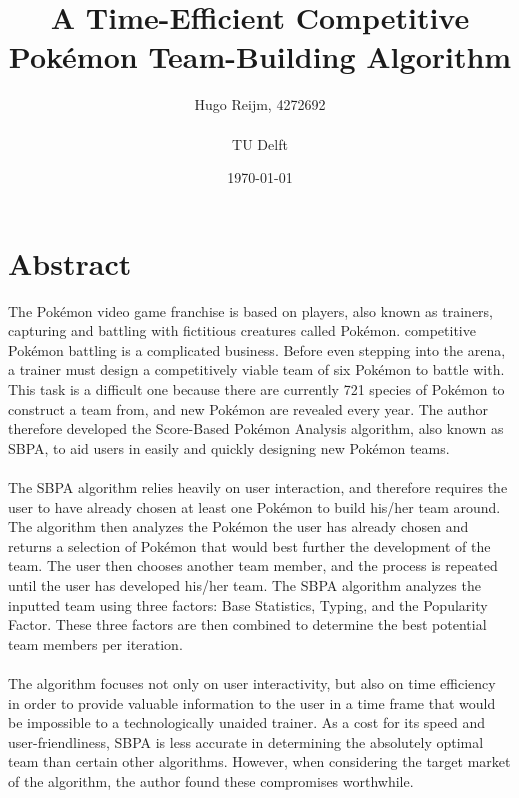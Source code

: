 \documentclass{article}
\title{A Time-Efficient Competitive Pok\'emon Team-Building Algorithm}
\author{Hugo Reijm, 4272692\\\\TU Delft}
\date{\today}
\begin{document}
\maketitle

\newpage
\section*{Abstract}
The Pok\'emon video game franchise is based on players, also known as trainers, capturing and battling with fictitious creatures called Pok\'emon. competitive Pok\'emon battling is a complicated business. Before even stepping into the arena, a trainer must design a competitively viable team of six Pok\'emon to battle with. This task is a difficult one because there are currently 721 species of Pok\'emon to construct a team from, and new Pok\'emon are revealed every year. The author therefore developed the Score-Based Pok\'emon Analysis algorithm, also known as SBPA, to aid users in easily and quickly designing new Pok\'emon teams.\\\\
The SBPA algorithm relies heavily on user interaction, and therefore requires the user to have already chosen at least one Pok\'emon to build his/her team around. The algorithm then analyzes the Pok\'emon the user has already chosen and returns a selection of Pok\'emon that would best further the development of the team. The user then chooses another team member, and the process is repeated until the user has developed his/her team. The SBPA algorithm analyzes the inputted team using three factors: Base Statistics, Typing, and the Popularity Factor. These three factors are then combined to determine the best potential team members per iteration.\\\\
The algorithm focuses not only on user interactivity, but also on time efficiency in order to provide valuable information to the user in a time frame that would be impossible to a technologically unaided trainer. As a cost for its speed and user-friendliness, SBPA is less accurate in determining the absolutely optimal team than certain other algorithms. However, when considering the target market of the algorithm, the author found these compromises worthwhile.

\newpage
\tableofcontents

\newpage
\end{document}
